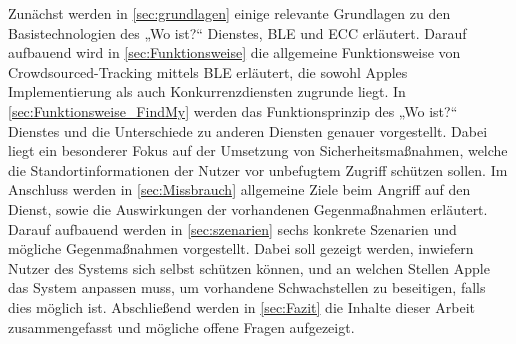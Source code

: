 Zunächst werden in \autoref{sec:grundlagen} einige relevante Grundlagen zu den Basistechnologien des „Wo ist?“ Dienstes, \ac{BLE} und \ac{ECC} erläutert.
Darauf aufbauend wird in \autoref{sec:Funktionsweise} die allgemeine Funktionsweise von Crowdsourced-Tracking mittels \ac{BLE} erläutert, die sowohl Apples Implementierung als auch Konkurrenzdiensten zugrunde liegt.
In \autoref{sec:Funktionsweise_FindMy} werden das Funktionsprinzip des „Wo ist?“ Dienstes und die Unterschiede zu anderen Diensten genauer vorgestellt.
Dabei liegt ein besonderer Fokus auf der Umsetzung von Sicherheitsmaßnahmen, welche die Standortinformationen der Nutzer vor unbefugtem Zugriff schützen sollen.
Im Anschluss werden in \autoref{sec:Missbrauch} allgemeine Ziele beim Angriff auf den Dienst, sowie die Auswirkungen der vorhandenen Gegenmaßnahmen erläutert.
Darauf aufbauend werden in \autoref{sec:szenarien} sechs konkrete Szenarien und mögliche Gegenmaßnahmen vorgestellt.
Dabei soll gezeigt werden, inwiefern Nutzer des Systems sich selbst schützen können, und an welchen Stellen Apple das System anpassen muss, um vorhandene Schwachstellen zu beseitigen, falls dies möglich ist.
Abschließend werden in \autoref{sec:Fazit} die Inhalte dieser Arbeit zusammengefasst und mögliche offene Fragen aufgezeigt. 